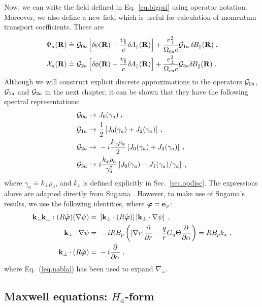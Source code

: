 Now, we can write the field defined in Eq.~\ref{eq.bigpsi} using operator 
notation.  Moreover, we also define a new field which is useful for 
calculation of momentum transport coefficients.  These are
%
\begin{align}
\Psi_a(\mathbf{R}) \doteq &~{\cal G}_{0a} \left[ \delta \hskip -1pt \phi(\mathbf{R}) - \frac{v_\parallel}{c} \delta \hskip -1pt A_\parallel(\mathbf{R}) \right]
 + \frac{v_\perp^2}{\Omega_{ca} c} {\cal G}_{1a} \, \delta \hskip -1pt B_\parallel(\mathbf{R}) \; , \\
\mathcal{X}_a(\mathbf{R}) \doteq &~{\cal G}_{2a} \left[ \delta \hskip -1pt \phi(\mathbf{R}) - \frac{v_\parallel}{c} \delta \hskip -1pt A_\parallel(\mathbf{R}) \right]
 + \frac{v_\perp^2}{\Omega_{ca} c} {\cal G}_{3a} \delta \hskip -1pt B_\parallel(\mathbf{R}) \; . 
\end{align}
%
Although we will construct explicit discrete 
approximations to the operators ${\cal G}_{0a}$, ${\cal G}_{1a}$ and ${\cal G}_{2a}$
in the next chapter, it can be shown that they have the following 
spectral representations:
%
\begin{align}
{\cal G}_{0a} \rightarrow &~J_0(\gamma_a) \; , \\
{\cal G}_{1a} \rightarrow &~\frac{1}{2} \left[ 
  J_0(\gamma_a) + J_2(\gamma_a) \right] \; , \\
{\cal G}_{2a} \rightarrow &~-i \frac{k_x \rho_a}{2} \left[ 
  J_0(\gamma_a) + J_2(\gamma_a) \right] \; , \\
{\cal G}_{3a} \rightarrow &~i \frac{k_x \rho_a}{\gamma_a^2} \left[ 
  J_0(\gamma_a) - J_1(\gamma_a)/\gamma_a \right] \; ,
\end{align}
%
where $\gamma_a \doteq k_\perp \rho_a$, and $k_x$ is defined explicitly in 
Sec.~\ref{sec.opdisc}.  The expressions above are adapted directly from Sugama \cite{sugama:1998}.  
However, to make use of Sugama's results, we use the following identities, 
where $\boldsymbol{\varphi} = \mathbf{e}_\varphi$:
%
\begin{align}
\mathbf{k}_\perp\mathbf{k}_\perp : (R\hat{\boldsymbol{\varphi}}) (\nabla\psi) 
 = &~ \left[ \mathbf{k}_\perp \cdot  (R\hat{\boldsymbol{\varphi}}) \right] 
      \left[ \mathbf{k}_\perp \cdot \nabla\psi \right] \; , \\
\mathbf{k}_\perp \cdot \nabla\psi = &~ -i R B_p \left( |\nabla r| \frac{\partial}{\partial r} 
- \frac{q}{r} G_q \Theta \frac{\partial}{\partial\alpha} \right) = R B_p k_x \; , \\
\mathbf{k}_\perp \cdot  (R\hat{\boldsymbol{\varphi}}) 
 = &~ -i \frac{\partial}{\partial\alpha} \; ,
\end{align}
% 
where Eq.~(\ref{eq.nabla}) has been used to expand $\nabla_\perp$.

\subsection{Maxwell equations: $H_a$-form}

